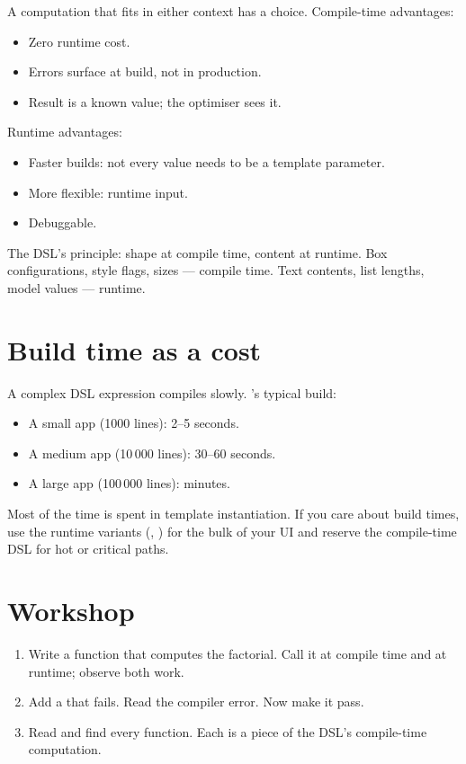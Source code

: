 A computation that fits in either context has a choice.
Compile-time advantages:

\begin{itemize}[leftmargin=*]
  \item Zero runtime cost.
  \item Errors surface at build, not in production.
  \item Result is a known value; the optimiser sees it.
\end{itemize}

Runtime advantages:

\begin{itemize}[leftmargin=*]
  \item Faster builds: not every value needs to be a template
    parameter.
  \item More flexible: runtime input.
  \item Debuggable.
\end{itemize}

The DSL's principle: shape at compile time, content at runtime.
Box configurations, style flags, sizes --- compile time. Text
contents, list lengths, model values --- runtime.

\section{Build time as a cost}

A complex DSL expression compiles slowly. \maya{}'s typical
build:

\begin{itemize}[leftmargin=*]
  \item A small app (1000 lines): 2--5 seconds.
  \item A medium app (10\,000 lines): 30--60 seconds.
  \item A large app (100\,000 lines): minutes.
\end{itemize}

Most of the time is spent in template instantiation. If you
care about build times, use the runtime variants
(, ) for the bulk of your
UI and reserve the compile-time DSL for hot or critical paths.

\section*{Workshop}

\begin{enumerate}[leftmargin=*]
  \item Write a  function that computes the
    factorial. Call it at compile time and at runtime; observe
    both work.
  \item Add a  that fails. Read the
    compiler error. Now make it pass.
  \item Read  and find every
     function. Each is a piece of the DSL's
    compile-time computation.
\end{enumerate}

